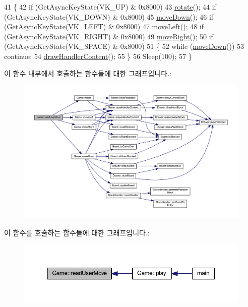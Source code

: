 \begin{DoxyCode}
41     \{
42         \textcolor{keywordflow}{if} (GetAsyncKeyState(VK\_UP) & 0x8000)
43             \mbox{\hyperlink{class_game_a8727c9c167265bff376f606d02687c6b}{rotate}}();
44         \textcolor{keywordflow}{if} (GetAsyncKeyState(VK\_DOWN) & 0x8000)
45             \mbox{\hyperlink{class_game_af379862400da53dd8f296f0990c0953f}{moveDown}}();
46         \textcolor{keywordflow}{if} (GetAsyncKeyState(VK\_LEFT) & 0x8000)
47             \mbox{\hyperlink{class_game_a3bd586b9c1bcd71f78bc2c2f7e2fe9e7}{moveLeft}}();
48         \textcolor{keywordflow}{if} (GetAsyncKeyState(VK\_RIGHT) & 0x8000)
49             \mbox{\hyperlink{class_game_a36ee055aa2c311deea72c38f50814007}{moveRight}}();
50         \textcolor{keywordflow}{if} (GetAsyncKeyState(VK\_SPACE) & 0x8000)
51         \{
52             \textcolor{keywordflow}{while} (\mbox{\hyperlink{class_game_af379862400da53dd8f296f0990c0953f}{moveDown}}())
53                 \textcolor{keywordflow}{continue};
54             \mbox{\hyperlink{class_game_aa61075838d60bc5c850b72bc4804b7b8}{drawHandlerContent}}();
55         \}
56         Sleep(100);
57     \}
\end{DoxyCode}
이 함수 내부에서 호출하는 함수들에 대한 그래프입니다.\+:
\nopagebreak
\begin{figure}[H]
\begin{center}
\leavevmode
\includegraphics[width=350pt]{class_game_aeb128045605ef167c233da9f993d407d_cgraph}
\end{center}
\end{figure}
이 함수를 호출하는 함수들에 대한 그래프입니다.\+:
\nopagebreak
\begin{figure}[H]
\begin{center}
\leavevmode
\includegraphics[width=350pt]{class_game_aeb128045605ef167c233da9f993d407d_icgraph}
\end{center}
\end{figure}
\mbox{\label{class_game_a8727c9c167265bff376f606d02687c6b}} 
